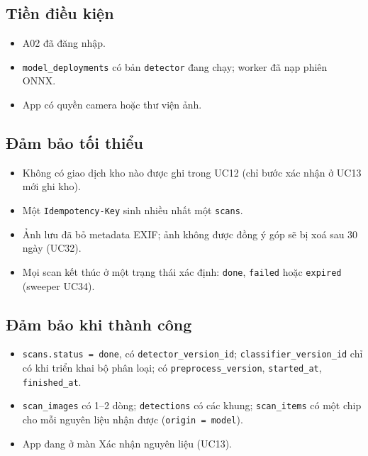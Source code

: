 \subsection{Tiền điều kiện}
\begin{itemize}
\item A02 đã đăng nhập.
\item {\small\texttt{model\_\allowbreak{}\allowbreak{}deployments}} có bản {\small\texttt{detector}} đang chạy; worker đã nạp phiên ONNX.
\item App có quyền camera hoặc thư viện ảnh.
\end{itemize}
\subsection{Đảm bảo tối thiểu}
\begin{itemize}
\item Không có giao dịch kho nào được ghi trong UC12 (chỉ bước xác nhận ở UC13 mới ghi kho).
\item Một {\small\texttt{Idempotency-\allowbreak{}Key}} sinh nhiều nhất một {\small\texttt{scans}}.
\item Ảnh lưu đã bỏ metadata EXIF; ảnh không được đồng ý góp sẽ bị xoá sau 30 ngày (UC32).
\item Mọi scan kết thúc ở một trạng thái xác định: {\small\texttt{done}}, {\small\texttt{failed}} hoặc {\small\texttt{expired}} (sweeper UC34).
\end{itemize}
\subsection{Đảm bảo khi thành công}
\begin{itemize}
\item {\small\texttt{scans.\allowbreak{}status = done}}, có {\small\texttt{detector\_\allowbreak{}\allowbreak{}version\_\allowbreak{}\allowbreak{}id}}; {\small\texttt{classifier\_\allowbreak{}\allowbreak{}version\_\allowbreak{}\allowbreak{}id}} chỉ có khi triển khai bộ phân loại; có {\small\texttt{preprocess\_\allowbreak{}\allowbreak{}version}}, {\small\texttt{started\_\allowbreak{}\allowbreak{}at}}, {\small\texttt{finished\_\allowbreak{}\allowbreak{}at}}.
\item {\small\texttt{scan\_\allowbreak{}\allowbreak{}images}} có 1--2 dòng; {\small\texttt{detections}} có các khung; {\small\texttt{scan\_\allowbreak{}\allowbreak{}items}} có một chip cho mỗi nguyên liệu nhận được ({\small\texttt{origin = model}}).
\item App đang ở màn Xác nhận nguyên liệu (UC13).
\end{itemize}
